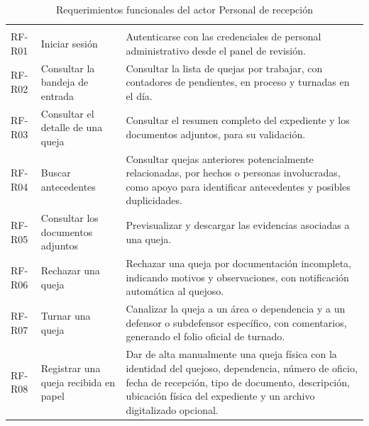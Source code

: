 	\small
	\renewcommand{\arraystretch}{1.2}
	
	\begin{longtable}{|p{1.5cm}|p{3.6cm}|p{9.0cm}|}
		\caption{Requerimientos funcionales del actor Personal de recepción}
		\label{tab:rf_recepcion} \\
		\hline
		\rowcolor{headerblue}
		\headercell{ID} & \headercell{Requerimiento} & \headercell{Descripción} \\
		\hline
		\endfirsthead
	
		\hline
		\rowcolor{headerblue}
		\headercell{ID} & \headercell{Requerimiento} & \headercell{Descripción} \\
		\hline
		\endhead
	
		RF-R01 & Iniciar sesión & Autenticarse con las credenciales de personal administrativo desde
		el panel de revisión. \\ \hline
	
		RF-R02 & Consultar la bandeja de entrada & Consultar la lista de quejas por trabajar, con
		contadores de pendientes, en proceso y turnadas en el día. \\ \hline
	
		RF-R03 & Consultar el detalle de una queja & Consultar el resumen completo del expediente y
		los documentos adjuntos, para su validación. \\ \hline
	
		RF-R04 & Buscar antecedentes & Consultar quejas anteriores potencialmente relacionadas,
		por hechos o personas involucradas, como apoyo para identificar antecedentes y posibles duplicidades. \\ \hline
	
		RF-R05 & Consultar los documentos adjuntos & Previsualizar y descargar las evidencias
		asociadas a una queja. \\ \hline
	
		RF-R06 & Rechazar una queja & Rechazar una queja por documentación incompleta, indicando
		motivos y observaciones, con notificación automática al quejoso. \\ \hline
	
		RF-R07 & Turnar una queja & Canalizar la queja a un área o dependencia y a un defensor o
		subdefensor específico, con comentarios, generando el folio oficial de turnado. \\ \hline
	
		RF-R08 & Registrar una queja recibida en papel & Dar de alta manualmente una queja física
		con la identidad del quejoso, dependencia, número de oficio, fecha de recepción, tipo de
		documento, descripción, ubicación física del expediente y un archivo digitalizado opcional.
		\\ \hline
	

\end{longtable}
